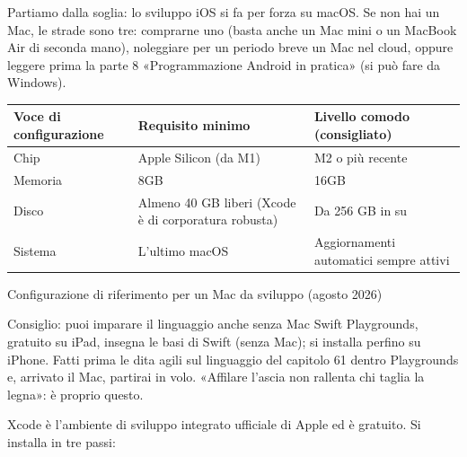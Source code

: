 


Partiamo dalla soglia: lo sviluppo iOS si fa per forza su macOS. Se non hai un Mac, le strade sono tre: comprarne uno (basta anche un Mac mini o un MacBook Air di seconda mano), noleggiare per un periodo breve un Mac nel cloud, oppure leggere prima la parte 8 «Programmazione Android in pratica» (si può fare da Windows).

\begin{center}
\begin{tabularx}{\linewidth}{|X|X|X|}
\hline
\textbf{Voce di configurazione} & \textbf{Requisito minimo} & \textbf{Livello comodo (consigliato)} \tabularnewline
\hline
Chip & Apple Silicon (da M1) & M2 o più recente \tabularnewline
Memoria & 8GB & 16GB \tabularnewline
Disco & Almeno 40 GB liberi (Xcode è di corporatura robusta) & Da 256 GB in su \tabularnewline
Sistema & L'ultimo macOS & Aggiornamenti automatici sempre attivi \tabularnewline
\hline
\end{tabularx}
\end{center}

\begin{center}\small\color{gray}Configurazione di riferimento per un Mac da sviluppo (agosto 2026)\end{center}

\begin{tcbinfo}{Consiglio: puoi imparare il linguaggio anche senza Mac}
Swift Playgrounds, gratuito su iPad, insegna le basi di Swift (senza Mac); si installa perfino su iPhone. Fatti prima le dita agili sul linguaggio del capitolo 61 dentro Playgrounds e, arrivato il Mac, partirai in volo. «Affilare l'ascia non rallenta chi taglia la legna»: è proprio questo.

\end{tcbinfo}


Xcode è l'ambiente di sviluppo integrato ufficiale di Apple ed è gratuito. Si installa in tre passi:

